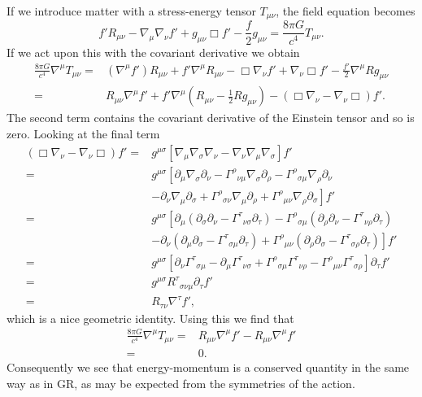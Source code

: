 \documentclass[a4paper, 11pt, titlepage, twoside]{report}
\newcommand{\recip}[1]{\ensuremath{\frac{1}{#1}}}
\begin{document}
If we introduce matter with a stress-energy tensor $T_{\mu\nu}$, the field equation becomes
\begin{equation}
f'R_{\mu\nu} - \nabla_\mu\nabla_\nu f' + g_{\mu\nu}\Box f' - \frac{f}{2}g_{\mu\nu} = \frac{8\pi G}{c^4}T_{\mu\nu}.
\end{equation}
If we act upon this with the covariant derivative we obtain
\begin{align}
\frac{8\pi G}{c^4}\nabla^\mu T_{\mu\nu} = {} & (\nabla^\mu f')R_{\mu\nu} + f'\nabla^\mu R_{\mu\nu} - \Box\nabla_\nu f' + \nabla_\nu\Box f' - \frac{f'}{2}\nabla^\mu R g_{\mu\nu} \nonumber \\
= {} & R_{\mu\nu}\nabla^\mu f' + f'\nabla^\mu\left(R_{\mu\nu} - \recip{2}R g_{\mu\nu}\right) - \left(\Box\nabla_\nu - \nabla_\nu\Box\right)f'.
\end{align}
The second term contains the covariant derivative of the Einstein tensor and so is zero. Looking at the final term
\begin{align}
\left(\Box\nabla_\nu - \nabla_\nu\Box\right)f' = {} & g^{\mu\sigma}\left[\nabla_\mu\nabla_\sigma\nabla_\nu - \nabla_\nu\nabla_\mu\nabla_\sigma\right]f' \nonumber \\
= {} & g^{\mu\sigma}\left[\partial_\mu\nabla_\sigma\partial_\nu - {\Gamma^\rho}_{\nu\mu}\nabla_\sigma\partial_\rho - {\Gamma^\rho}_{\sigma\mu}\nabla_\rho\partial_\nu\right. \nonumber \\
 & \left. - \partial_\nu\nabla_\mu\partial_\sigma + {\Gamma^\rho}_{\sigma\nu}\nabla_\mu\partial_\rho + {\Gamma^\rho}_{\mu\nu}\nabla_\rho\partial_\sigma\right]f' \nonumber \\
= {} & g^{\mu\sigma}\left[\partial_\mu\left(\partial_\sigma\partial_\nu - {\Gamma^\tau}_{\nu\sigma}\partial_\tau\right) - {\Gamma^\rho}_{\sigma\mu}\left(\partial_\rho\partial_\nu - {\Gamma^\tau}_{\nu\rho}\partial_\tau\right)\right. \nonumber \\
 & \left. - \partial_\nu\left(\partial_\mu\partial_\sigma - {\Gamma^\tau}_{\sigma\mu}\partial_\tau\right) + {\Gamma^\rho}_{\mu\nu}\left(\partial_\rho\partial_\sigma - {\Gamma^\tau}_{\sigma\rho}\partial_\tau\right)\right]f' \nonumber \\
= {} & g^{\mu\sigma}\left[\partial_\nu{\Gamma^\tau}_{\sigma\mu} -\partial_\mu{\Gamma^\tau}_{\nu\sigma} + {\Gamma^\rho}_{\sigma\mu} {\Gamma^\tau}_{\nu\rho} - {\Gamma^\rho}_{\mu\nu}{\Gamma^\tau}_{\sigma\rho}\right]\partial_\tau f' \nonumber \\
= {} & g^{\mu\sigma}{R^\tau}_{\sigma\nu\mu}\partial_\tau f' \nonumber \\
= {} & R_{\tau\nu}\nabla^\tau f',
\end{align}
which is a nice geometric identity. Using this we find that
\begin{align}
\frac{8\pi G}{c^4}\nabla^\mu T_{\mu\nu} = {} & R_{\mu\nu}\nabla^\mu f' - R_{\mu\nu}\nabla^\mu f' \nonumber \\
 = {} & 0.
\end{align}
Consequently we see that energy-momentum is a conserved quantity in the same way as in GR, as may be expected from the symmetries of the action.
\end{document}
